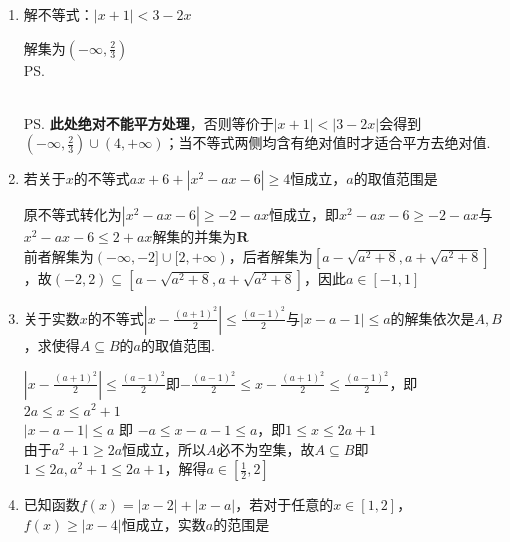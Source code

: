 \begin{enumerate}
    \begin{enumerate}
        \item 解不等式：$|x+1| < 3-2x$
        \begin{jieda}
            解集为$(-\infty, \frac{2}{3})$ \\
            \ps {} \\
            \ps \textbf{此处绝对不能平方处理}，否则等价于$|x+1| < |3-2x|$会得到$(-\infty, \frac{2}{3}) \cup (4, +\infty)$；当不等式两侧均含有绝对值时才适合平方去绝对值.
        \end{jieda}
        \item 若关于$x$的不等式$ax + 6 + |x^2 - ax - 6| \geq 4$恒成立，$a$的取值范围是\blkda{$[-1, 1]$}
        \begin{jieda}
            原不等式转化为$|x^2 - ax - 6| \geq -2 - ax$恒成立，即$x^2 - ax - 6 \geq -2 - ax$与$x^2 - ax - 6 \leq 2 + ax$解集的并集为$\mathbf{R}$ \\
            前者解集为$(-\infty, -2] \cup [2, +\infty)$，后者解集为$[a-\sqrt{a^2+8}, a + \sqrt{a^2+8}]$，故$(-2, 2) \subseteq [a-\sqrt{a^2+8}, a + \sqrt{a^2+8}]$，因此$a \in [-1, 1]$
        \end{jieda}
        \item 关于实数$x$的不等式$\left | x - \frac{(a+1)^2}{2} \right | \leq \frac{(a-1)^2}{2}$与$|x-a-1| \leq a$的解集依次是$A, B$，求使得$A \subseteq B$的$a$的取值范围.
        \begin{jieda}
            $\left | x - \frac{(a+1)^2}{2} \right | \leq \frac{(a-1)^2}{2}$即$-\frac{(a-1)^2}{2} \leq x - \frac{(a+1)^2}{2} \leq \frac{(a-1)^2}{2}$，即$2a \leq x \leq a^2+1$ \\
            $|x-a-1| \leq a$ 即 $-a \leq x-a-1 \leq a$，即$1 \leq x \leq 2a+1$ \\
            由于$a^2+1 \geq 2a$恒成立，所以$A$必不为空集，故$A \subseteq B$即$1 \leq 2a, a^2+1 \leq 2a+1$，解得$a \in [\frac{1}{2}, 2]$
        \end{jieda}
        \item 已知函数$f(x) = |x-2| + |x-a|$，若对于任意的$x \in [1, 2]$，$f(x) \geq |x-4|$恒成立，实数$a$的范围是\blkda[4]{$(-\infty, -1] \cup [4, +\infty)$}
        \begin{jieda}

\end{jieda}
\end{enumerate}
\end{enumerate}
